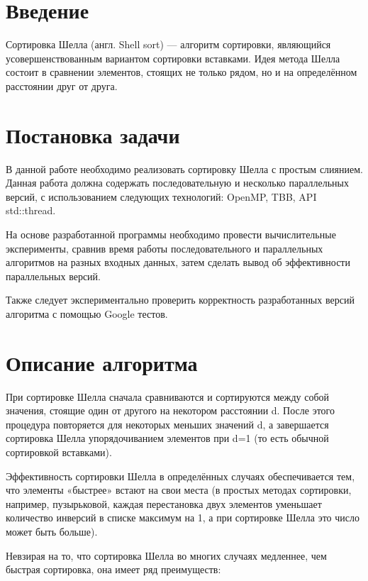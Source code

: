 \documentclass{report}
\begin{document}
\setcounter{page}{2}

\section*{Введение}
Сортировка Шелла (англ. Shell sort) — алгоритм сортировки, являющийся усовершенствованным вариантом сортировки вставками. Идея метода Шелла состоит в сравнении элементов, стоящих не только рядом, но и на определённом расстоянии друг от друга.
\newpage

\section*{Постановка задачи}
В данной работе необходимо реализовать сортировку Шелла с простым слиянием. Данная работа должна содержать последовательную и несколько параллельных версий, с использованием следующих технологий: OpenMP, TBB, API std::thread. 
\par
На основе разработанной программы необходимо провести вычислительные эксперименты, сравнив время работы последовательного и параллельных алгоритмов на разных входных данных, затем сделать вывод об эффективности параллельных версий.
\par
Также следует экспериментально проверить корректность разработанных версий алгоритма с помощью Google тестов.
\newpage

\section*{Описание алгоритма}
При сортировке Шелла сначала сравниваются и сортируются между собой значения, стоящие один от другого на некотором расстоянии d. После этого процедура повторяется для некоторых меньших значений d, а завершается сортировка Шелла упорядочиванием элементов при d=1 (то есть обычной сортировкой вставками). 
\par
Эффективность сортировки Шелла в определённых случаях обеспечивается тем, что элементы «быстрее» встают на свои места (в простых методах сортировки, например, пузырьковой, каждая перестановка двух элементов уменьшает количество инверсий в списке максимум на 1, а при сортировке Шелла это число может быть больше).

Невзирая на то, что сортировка Шелла во многих случаях медленнее, чем быстрая сортировка, она имеет ряд преимуществ:
\end{document}
